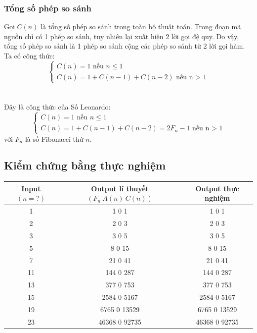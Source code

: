 \documentclass[12pt]{article}
\begin{document}
\subsubsection{Tổng số phép so sánh}
Gọi $C(n)$ là tổng số phép so sánh trong toàn bộ thuật toán. Trong đoạn mã nguồn chỉ có 1 phép so sánh, tuy nhiên lại xuất hiện 2 lời gọi đệ quy. Do vậy, tổng số phép so sánh là 1 phép so sánh cộng các phép so sánh từ 2 lời gọi hàm. Ta có công thức:
$$
\begin{cases}
C(n) = 1 \text{ nếu $n \leq 1$} \\
C(n) = 1 + C(n - 1) + C(n - 2) \text{ nếu n > 1}
\end{cases}
$$
\\\\
Đây là công thức của Số Leonardo:
$$
\begin{cases}
C(n) = 1 \text{ nếu $n \leq 1$} \\
C(n) = 1 + C(n - 1) + C(n - 2) = 2F_n - 1 \text{ nếu n > 1}
\end{cases}
$$
với $F_n$ là số Fibonacci thứ $n$\cite{konuralpjournalmath848006}.

\subsection{Kiểm chứng bằng thực nghiệm}
\begin{center}
\centering
\begin{tabular}{c|c|c}
    Input $(n = ?)$ & Output lí thuyết $(F_n\ A(n)\ C(n))$ & Output thực nghiệm \\
    \hline 
    1 & 1 0 1 & 1 0 1 \\ 
    2 & 2 0 3 & 2 0 3 \\
    3 & 3 0 5 & 3 0 5 \\
    5 & 8 0 15 & 8 0 15 \\
    7 & 21 0 41 & 21 0 41 \\
    11 & 144 0 287 & 144 0 287 \\
    13 & 377 0 753 & 377 0 753 \\
    15 & 2584 0 5167 & 2584 0 5167 \\
    19 & 6765 0 13529 & 6765 0 13529 \\
    23 & 46368 0 92735 & 46368 0 92735
\end{tabular}
\end{center}
\end{document}
